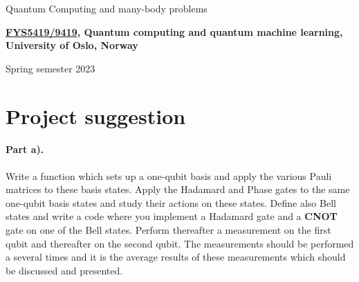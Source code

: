 \documentclass[%
oneside,                 %
final,                   %
10pt]{article}
\begin{document}

\newcommand{\exercisesection}[1]{\subsection*{#1}}






\thispagestyle{empty}

\begin{center}
{\LARGE\bf
\begin{spacing}{1.25}
Quantum Computing and many-body problems
\end{spacing}
}
\end{center}


\begin{center}
{\bf \href{{https://www.uio.no/studier/emner/matnat/fys/FYS5419/index-eng.html}}{FYS5419/9419}, Quantum computing and quantum machine learning, University of Oslo, Norway${}^{}$} \\ [0mm]
\end{center}

\begin{center}
\end{center}
    

\begin{center}
Spring semester 2023
\end{center}

\vspace{1cm}


\section{Project suggestion}

\paragraph{Part a).}
Write a function which sets up a one-qubit basis and apply the various
Pauli matrices to these basis states.  Apply the Hadamard and Phase
gates to the same one-qubit basis states and study their actions on
these states. Define also Bell states and write a code where you
implement a Hadamard gate and a \textbf{CNOT} gate on one of the Bell
states. Perform thereafter a measurement on the first qubit and
thereafter on the second qubit. The measurements should be performed a
several times and it is the average results of these measurements
which should be discussed and presented.
\end{document}
